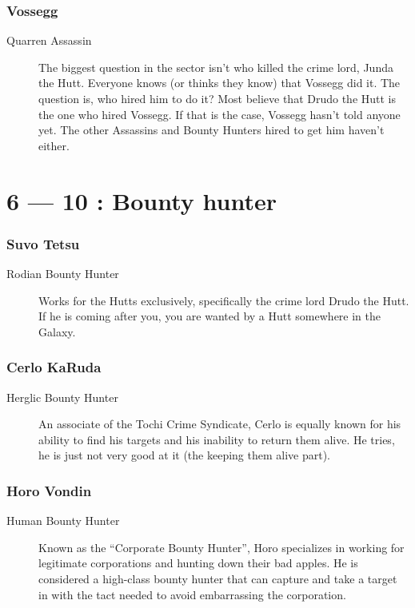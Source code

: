 \documentclass{article}
\begin{document}
\section{Vossegg}
\begin{description}
	\item [Quarren \male Assassin] The biggest question in the sector isn’t who killed the crime lord, Junda the Hutt. Everyone knows (or thinks they know) that Vossegg did it. The question is, who hired him to do it? Most believe that Drudo the Hutt is the one who hired Vossegg. If that is the case, Vossegg hasn’t told anyone yet. The other Assassins and Bounty Hunters hired to get him haven’t either.
\end{description}

\part*{6 --- 10 : Bounty hunter}
\setcounter{section}{5}
\section{Suvo Tetsu}
\begin{description}
	\item [ Rodian \male Bounty Hunter] Works for the Hutts exclusively, specifically the crime lord Drudo the Hutt. If he is coming after you, you are wanted by a Hutt somewhere in the Galaxy.
\end{description}
\section{Cerlo KaRuda}
\begin{description}
	\item [ Herglic \male Bounty Hunter] An associate of the Tochi Crime Syndicate, Cerlo is equally known for his ability to find his targets and his inability to return them alive. He tries, he is just not very good at it (the keeping them alive part).
\end{description}
\section{Horo Vondin}
\begin{description}
	\item [ Human \male Bounty Hunter] Known as the “Corporate Bounty Hunter”, Horo specializes in working for legitimate corporations and hunting down their bad apples. He is considered a high-class bounty hunter that can capture and take a target in with the tact needed to avoid embarrassing the corporation.
\end{description}
\end{document}
